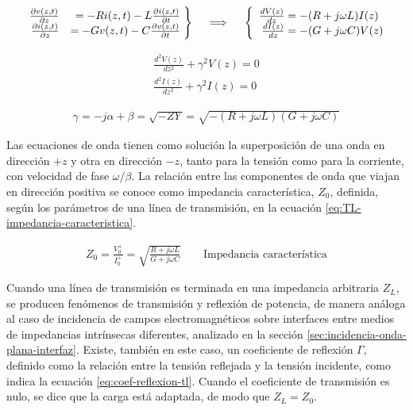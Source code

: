 \begin{align}
	\label{eq:Telegrafista}
	\left. \begin{array}{rr@{\mskip\thickmuskip}l}
	\frac{\partial v(z,t)}{\partial z} & = -R i(z,t) - L \frac{\partial i(z,t)}{\partial t}\\
	\frac{\partial i(z,t)}{\partial z} & = -G v(z,t) - C \frac{\partial v(z,t)}{\partial t}
	\end{array}\right\} \quad \implies \quad \left\{\begin{array}{r@{\mskip\thickmuskip}l}
	\frac{dV(z)}{dz} & = -(R+j\omega L)I(z) \\
	\frac{dI(z)}{dz} & = -(G+j\omega C)V(z) 
	\end{array}\right.
\end{align}


\begin{equation}
\begin{aligned}
	\frac{d^2 V(z)}{dz^2} + \gamma^2 V(z) = 0 \\
	\frac{d^2 I(z)}{dz^2} + \gamma^2 I(z) = 0
\end{aligned}
\label{eq:ec-onda-TL}
\end{equation}

\begin{align}
	\label{eq:gamma-tl}
	\gamma = -j\alpha + \beta = \sqrt{-ZY} = \sqrt{-(R+j\omega L)(G+j\omega C)}	
\end{align}

 Las ecuaciones de onda tienen como solución la superposición de una onda en dirección $+z$ y otra en dirección $-z$, tanto para la tensión como para la corriente, con velocidad de fase $\omega/\beta$. La relación entre las componentes de onda que viajan en dirección positiva se conoce como impedancia característica, $Z_0$, definida, según los parámetros de una línea de transmisión, en la ecuación \ref{eq:TL-impedancia-caracteristica}.
 
\begin{align}
	\label{eq:TL-impedancia-caracteristica}
	Z_0 = \frac{V_0^+}{I_0^+} = \sqrt{\frac{R+j\omega L}{G+j\omega C}} \qquad \text{Impedancia característica}
\end{align}

Cuando una línea de transmisión es terminada en una impedancia arbitraria $Z_L$, se producen fenómenos de transmisión y reflexión de potencia, de manera análoga al caso de incidencia de campos electromagnéticos sobre interfaces entre medios de impedancias intrínsecas diferentes, analizado en la sección \ref{sec:incidencia-onda-plana-interfaz}. Existe, también en este caso, un coeficiente de reflexión $\Gamma$, definido como la relación entre la tensión reflejada y la tensión incidente, como indica la ecuación \ref{eq:coef-reflexion-tl}. Cuando el coeficiente de transmisión es nulo, se dice que la carga está adaptada, de modo que $Z_L = Z_0$.

